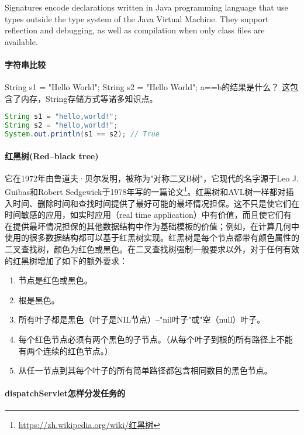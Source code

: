 \documentclass[../../../interview-questions.tex]{subfiles}
\begin{document}
Signatures encode declarations written in Java programming language that use types outside the type system of the Java Virtual Machine. They support reflection and debugging, as well as compilation when only class files are available.

\paragraph{字符串比较}

String s1 = "Hello World"; String s2 = "Hello World"; a==b的结果是什么？ 这包含了内存，String存储方式等诸多知识点。

\begin{lstlisting}[language=Java]
String s1 = "hello,world!";
String s2 = "hello,world!";
System.out.println(s1 == s2); // True
\end{lstlisting}

\paragraph{红黑树(Red–black tree)}

它在1972年由鲁道夫·贝尔发明，被称为"对称二叉B树"，它现代的名字源于Leo J. Guibas和Robert Sedgewick于1978年写的一篇论文\footnote{\url{https://zh.wikipedia.org/wiki/红黑树}}。红黑树和AVL树一样都对插入时间、删除时间和查找时间提供了最好可能的最坏情况担保。这不只是使它们在时间敏感的应用，如实时应用（real time application）中有价值，而且使它们有在提供最坏情况担保的其他数据结构中作为基础模板的价值；例如，在计算几何中使用的很多数据结构都可以基于红黑树实现。红黑树是每个节点都带有颜色属性的二叉查找树，颜色为红色或黑色。在二叉查找树强制一般要求以外，对于任何有效的红黑树增加了如下的额外要求：

\begin{enumerate}
\item {节点是红色或黑色。}
\item{根是黑色。}
\item{所有叶子都是黑色（叶子是NIL节点）--"nil叶子"或"空（null）叶子。}
\item{每个红色节点必须有两个黑色的子节点。（从每个叶子到根的所有路径上不能有两个连续的红色节点。）}
\item{从任一节点到其每个叶子的所有简单路径都包含相同数目的黑色节点。}
\end{enumerate}

\paragraph{dispatchServlet怎样分发任务的}
\end{document}
